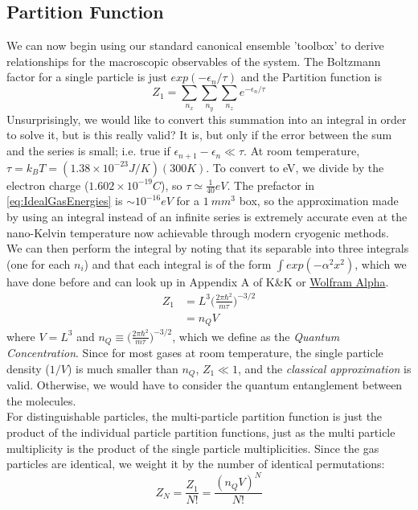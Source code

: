 \subsection{Partition Function}
We can now begin using our standard canonical ensemble 'toolbox' to derive relationships for the macroscopic observables of the system. The Boltzmann factor for a single particle is just $exp(-\epsilon_n/\tau)$ and the Partition function is
\begin{equation}
Z_1 = \sum_{n_x} \sum_{n_y} \sum_{n_z} e^{-\epsilon_n/\tau}
\end{equation}
Unsurprisingly, we would like to convert this summation into an integral in order to solve it, but is this really valid? It is, but only if the error between the sum and the series is small; i.e. true if $\epsilon_{n+1} - \epsilon_n \ll \tau$. 
At room temperature, $\tau = k_B T = (1.38 \times 10^{-23} J/K)(300 K)$. 
To convert to eV, we divide by the electron charge ($1.602 \times 10^{-19} C$), 
so $\tau \simeq \frac{1}{40} eV$. The
prefactor in \cref{eq:IdealGasEnergies} is $\sim 10^{-16} eV$ for a $1~mm^3$ box,
so the approximation made by using an integral instead of an infinite series is extremely accurate even at the nano-Kelvin temperature now achievable through modern cryogenic methods.\\

We can then perform the integral by noting that its separable into three integrals (one for each $n_i$) and that each integral is of the form $\int exp(-\alpha^2 x^2)$, which we have done before and can look up in Appendix A of K\&K or 
\href{http://www.wolframalpha.com/input/?i=integrate\%20exp(-a\%5E2\%20x\%5E2)\%20from\%20x\%3D0..infinity}{Wolfram Alpha}.
\begin{align}
Z_1 &= L^3 \bigg(\frac{2 \pi \hbar^2}{m \tau}\bigg)^{-3/2} \\
    &= n_Q V
\end{align}
where $V = L^3$ and $n_Q \equiv \bigg(\frac{2 \pi \hbar^2}{m \tau}\bigg)^{-3/2}$, which we define as the \emph{Quantum Concentration}. Since for most gases at
room temperature, the single particle density ($1/V$) is much smaller than
$n_Q$, $Z_1 \ll 1$, and the \textit{classical approximation} is valid. Otherwise, we would have to consider the quantum entanglement between the molecules.\\

For distinguishable particles, the multi-particle partition function is just the product of the individual particle partition functions, just as the multi particle multiplicity is the product of the single particle multiplicities. Since the
gas particles are identical, we weight it by the number of identical permutations:
\begin{equation}
Z_N = \frac{Z_1}{N!} = \frac{(n_Q V)^N}{N!}
\end{equation}



